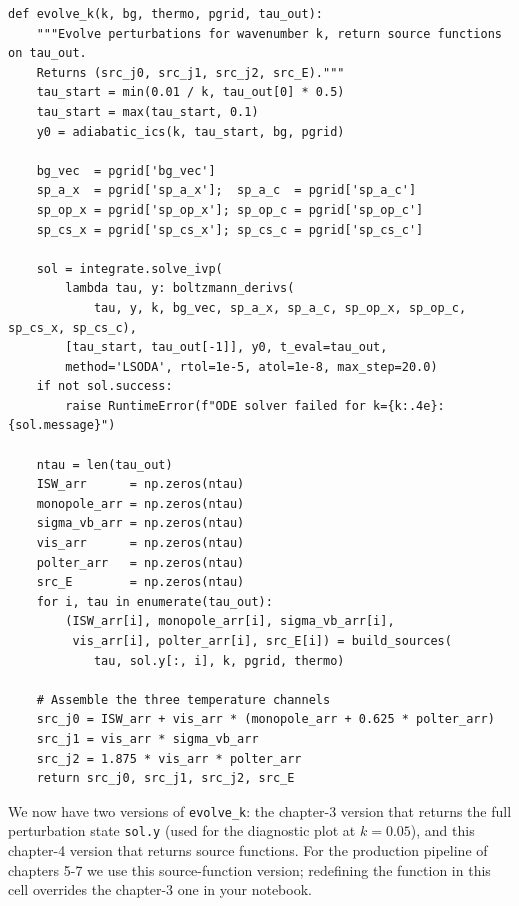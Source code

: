 \begin{codebox}
\begin{lstlisting}[style=python]
def evolve_k(k, bg, thermo, pgrid, tau_out):
    """Evolve perturbations for wavenumber k, return source functions on tau_out.
    Returns (src_j0, src_j1, src_j2, src_E)."""
    tau_start = min(0.01 / k, tau_out[0] * 0.5)
    tau_start = max(tau_start, 0.1)
    y0 = adiabatic_ics(k, tau_start, bg, pgrid)

    bg_vec  = pgrid['bg_vec']
    sp_a_x  = pgrid['sp_a_x'];  sp_a_c  = pgrid['sp_a_c']
    sp_op_x = pgrid['sp_op_x']; sp_op_c = pgrid['sp_op_c']
    sp_cs_x = pgrid['sp_cs_x']; sp_cs_c = pgrid['sp_cs_c']

    sol = integrate.solve_ivp(
        lambda tau, y: boltzmann_derivs(
            tau, y, k, bg_vec, sp_a_x, sp_a_c, sp_op_x, sp_op_c, sp_cs_x, sp_cs_c),
        [tau_start, tau_out[-1]], y0, t_eval=tau_out,
        method='LSODA', rtol=1e-5, atol=1e-8, max_step=20.0)
    if not sol.success:
        raise RuntimeError(f"ODE solver failed for k={k:.4e}: {sol.message}")

    ntau = len(tau_out)
    ISW_arr      = np.zeros(ntau)
    monopole_arr = np.zeros(ntau)
    sigma_vb_arr = np.zeros(ntau)
    vis_arr      = np.zeros(ntau)
    polter_arr   = np.zeros(ntau)
    src_E        = np.zeros(ntau)
    for i, tau in enumerate(tau_out):
        (ISW_arr[i], monopole_arr[i], sigma_vb_arr[i],
         vis_arr[i], polter_arr[i], src_E[i]) = build_sources(
            tau, sol.y[:, i], k, pgrid, thermo)

    # Assemble the three temperature channels
    src_j0 = ISW_arr + vis_arr * (monopole_arr + 0.625 * polter_arr)
    src_j1 = vis_arr * sigma_vb_arr
    src_j2 = 1.875 * vis_arr * polter_arr
    return src_j0, src_j1, src_j2, src_E
\end{lstlisting}
\end{codebox}

\begin{aside}
We now have two versions of \texttt{evolve\_k}: the chapter-3 version that returns the full perturbation state \texttt{sol.y} (used for the diagnostic plot at $k = 0.05$), and this chapter-4 version that returns source functions. For the production pipeline of chapters 5-7 we use this source-function version; redefining the function in this cell overrides the chapter-3 one in your notebook.
\end{aside}

